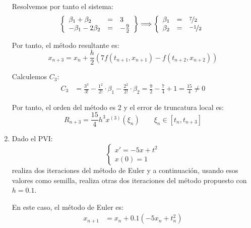 \begin{ejercicio}
\begin{enumerate}
        Resolvemos por tanto el sistema:
        \begin{equation*}
            \left\{
                \begin{array}{lcl}
                    \beta_1 + \beta_2 & = & 3 \\
                    -\beta_1 - 2\beta_2 & = & -\frac{9}{2}
                \end{array}
            \right\}
            \Longrightarrow
            \left\{
                \begin{array}{lcl}
                    \beta_1 & = & \nicefrac{7}{2} \\
                    \beta_2 & = & \nicefrac{-1}{2}
                \end{array}
            \right.
        \end{equation*}

        Por tanto, el método resultante es:
        \begin{equation*}
            x_{n+3} = x_n + \frac{h}{2}\left(7 f(t_{n+1}, x_{n+1}) - f(t_{n+2}, x_{n+2})\right)
        \end{equation*}

        Calculemos $C_3$:
        \begin{align*}
            C_3 &= \frac{3^3}{3!} - \frac{1^2}{2!}\cdot\beta_1 - \frac{2^2}{2!}\cdot\beta_2 = \frac{9}{2} - \frac{7}{4} +1 = \frac{15}{4}\neq 0
        \end{align*}

        Por tanto, el orden del método es 2 y el error de truncatura local es:
        \begin{equation*}
            R_{n+3} = \frac{15}{4}h^3x^{(3)}(\xi_n) \qquad \xi_n \in [t_n, t_{n+3}]
        \end{equation*}


        \item Dado el PVI:
            \begin{equation*}
                \begin{cases}
                    x' = -5x + t^2 \\
                    x(0) = 1
                \end{cases}
            \end{equation*}
            realiza dos iteraciones del método de Euler y a continuación, usando esos valores como semilla, realiza otras dos iteraciones del método propuesto con $h = 0.1$.

            En este caso, el método de Euler es:
            \begin{align*}
                x_{n+1} &= x_n + 0.1(-5x_n + t_n^2)
            \end{align*}


\end{enumerate}
\end{ejercicio}
